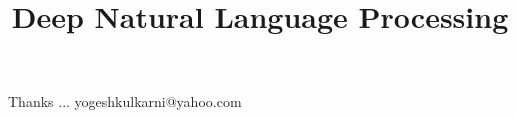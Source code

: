 \documentclass[xcolor=dvipsnames,compress,t,pdf,9pt]{beamer}
\title[\insertframenumber /\inserttotalframenumber]{Deep Natural Language Processing}
\begin{document}
	\begin{frame}
	\titlepage
	\end{frame}

	
	
	\begin{frame}[c]{}
	Thanks ...
	\vspace{5mm}
	yogeshkulkarni@yahoo.com
	\end{frame}
\end{document}
